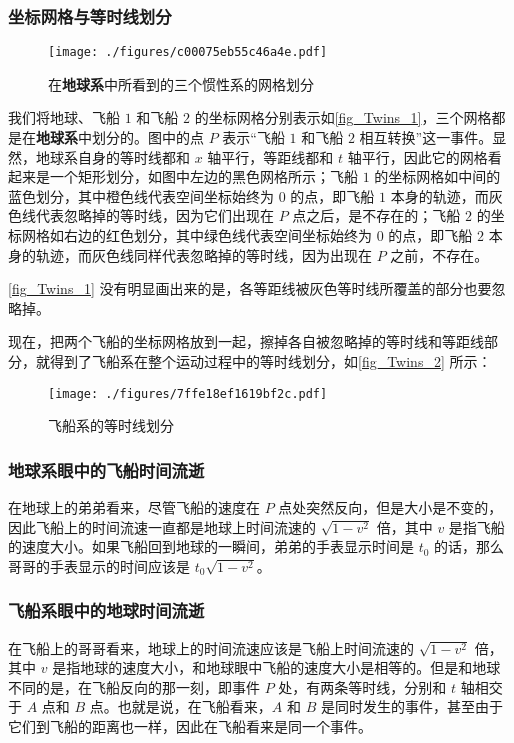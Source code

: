 \subsubsection{坐标网格与等时线划分}

\begin{figure}[ht]
\centering
\texttt{[image: ./figures/c00075eb55c46a4e.pdf]}
\caption{在\textbf{地球系}中所看到的三个惯性系的网格划分} \label{fig_Twins_1}
\end{figure}

我们将地球、飞船 $1$ 和飞船 $2$ 的坐标网格分别表示如\autoref{fig_Twins_1}，三个网格都是在\textbf{地球系}中划分的。图中的点 $P$ 表示“飞船 $1$ 和飞船 $2$ 相互转换”这一事件。显然，地球系自身的等时线都和 $x$ 轴平行，等距线都和 $t$ 轴平行，因此它的网格看起来是一个矩形划分，如图中左边的黑色网格所示；飞船 $1$ 的坐标网格如中间的蓝色划分，其中橙色线代表空间坐标始终为 $0$ 的点，即飞船 $1$ 本身的轨迹，而灰色线代表忽略掉的等时线，因为它们出现在 $P$ 点之后，是不存在的；飞船 $2$ 的坐标网格如右边的红色划分，其中绿色线代表空间坐标始终为 $0$ 的点，即飞船 $2$ 本身的轨迹，而灰色线同样代表忽略掉的等时线，因为出现在 $P$ 之前，不存在。

\autoref{fig_Twins_1} 没有明显画出来的是，各等距线被灰色等时线所覆盖的部分也要忽略掉。

现在，把两个飞船的坐标网格放到一起，擦掉各自被忽略掉的等时线和等距线部分，就得到了飞船系在整个运动过程中的等时线划分，如\autoref{fig_Twins_2} 所示：

\begin{figure}[ht]
\centering
\texttt{[image: ./figures/7ffe18ef1619bf2c.pdf]}
\caption{飞船系的等时线划分} \label{fig_Twins_2}
\end{figure}

\subsubsection{地球系眼中的飞船时间流逝}

在地球上的弟弟看来，尽管飞船的速度在 $P$ 点处突然反向，但是大小是不变的，因此飞船上的时间流速一直都是地球上时间流速的 $\sqrt{1-v^2}$ 倍，其中 $v$ 是指飞船的速度大小。如果飞船回到地球的一瞬间，弟弟的手表显示时间是 $t_0$ 的话，那么哥哥的手表显示的时间应该是 $t_0\sqrt{1-v^2}$。

\subsubsection{飞船系眼中的地球时间流逝}

在飞船上的哥哥看来，地球上的时间流速应该是飞船上时间流速的 $\sqrt{1-v^2}$ 倍，其中 $v$ 是指地球的速度大小，和地球眼中飞船的速度大小是相等的。但是和地球不同的是，在飞船反向的那一刻，即事件 $P$ 处，有两条等时线，分别和 $t$ 轴相交于 $A$ 点和 $B$ 点。也就是说，在飞船看来，$A$ 和 $B$ 是同时发生的事件，甚至由于它们到飞船的距离也一样，因此在飞船看来是同一个事件。


